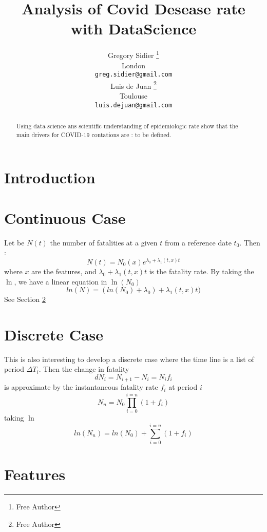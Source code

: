 \documentclass{article}
\title{Analysis of Covid Desease rate with DataScience }
\author{
  Gregory Sidier \thanks{Free Author} \\
  London\\
  \texttt{greg.sidier@gmail.com} \\
   \And
Luis de Juan \thanks{Free Author} \\
  Toulouse\\
  \texttt{luis.dejuan@gmail.com} \\
}
\begin{document}
\maketitle

\begin{abstract}
Using data science ans scientific understanding of epidemiologic rate show that the main drivers for COVID-19 contations are : to be defined. 
\end{abstract}


\section{Introduction}

\section{Continuous Case}
\label{sec:continuous_case}
Let be $N(t)$ the number of fatalities at a given $t$ from a reference date $t_0$. Then :
\begin{equation}
N(t) = N_0(x)e^{\lambda_0 + \lambda_1(t,x) t}
\end{equation}
where $x$ are the features, and $\lambda_0 + \lambda_1(t,x) t$ is the fatality rate. By taking the $\ln$, we have a linear equation in $\ln(N_0)$
\begin{equation}
ln(N) = (ln(N_0) + \lambda_0)+ \lambda_1(t,x) t) 
\end{equation}
See Section \ref{sec:continuous_case}

\section{Discrete Case}
\label{sec:discrete_case}
This is also interesting to develop a discrete case where the time line is a list of period $\Delta T_i$. Then the change in fatality  
\begin{equation}
dN_i = N_{i+1} - N_i = N_i f_i
\end{equation}
is approximate by the instantaneous fatality rate $f_i$ at period $i$
\begin{equation}
N_n = N_0\prod_{i=0}^{i=n}(1+f_i)
\end{equation}
taking $\ln$
\begin{equation}
ln(N_n) = ln(N_0)+ \sum_{i=0}^{i=n}(1+f_i)
\end{equation}
\section{Features}
\end{document}
